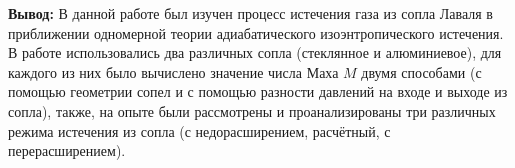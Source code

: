 \documentclass[a4paper,12pt]{article}
\begin{document}
\textbf{Вывод:} 
В данной работе был изучен процесс истечения газа из сопла Лаваля в приближении одномерной теории адиабатического изоэнтропического истечения. В работе использовались два различных сопла (стеклянное и алюминиевое), для каждого из них было вычислено значение числа Маха $M$ двумя способами (с помощью геометрии сопел и с помощью разности давлений на входе и выходе из сопла), также, на опыте были рассмотрены и проанализированы три различных режима истечения из сопла (с недорасширением, расчётный, с перерасширением).
\end{document}
